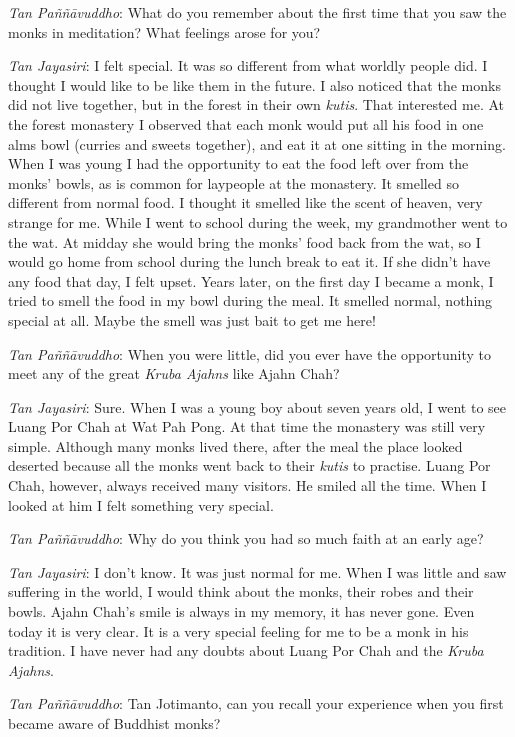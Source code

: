 \emph{Tan Paññāvuddho}: What do you remember about the first time that
you saw the monks in meditation? What feelings arose for you?

\emph{Tan Jayasiri}: I felt special. It was so different from what
worldly people did. I thought I would like to be like them in the
future. I also noticed that the monks did not live together, but in the
forest in their own \emph{kutis}. That interested me. At the forest
monastery I observed that each monk would put all his food in one alms
bowl (curries and sweets together), and eat it at one sitting in the
morning. When I was young I had the opportunity to eat the food left
over from the monks' bowls, as is common for laypeople at the monastery.
It smelled so different from normal food. I thought it smelled like the
scent of heaven, very strange for me. While I went to school during the
week, my grandmother went to the wat. At midday she would bring the
monks' food back from the wat, so I would go home from school during the
lunch break to eat it. If she didn't have any food that day, I felt
upset. Years later, on the first day I became a monk, I tried to smell
the food in my bowl during the meal. It smelled normal, nothing special
at all. Maybe the smell was just bait to get me here!

\emph{Tan Paññāvuddho}‎: When you were little, did you ever have the
opportunity to meet any of the great \emph{Kruba Ajahns‎‎} like Ajahn
Chah?

\emph{Tan Jayasiri}: Sure. When I was a young boy about seven years old,
I went to see Luang Por Chah at Wat Pah Pong. At that time the monastery
was still very simple. Although many monks lived there, after the meal
the place looked deserted because all the monks went back to their
\emph{kutis} to practise. Luang Por Chah, however, always received many
visitors. He smiled all the time. When I looked at him I felt something
very special.

\emph{Tan Paññāvuddho}‎: Why do you think you had so much faith at an
early age?

\emph{Tan Jayasiri}: I don't know. It was just normal for me. When I was
little and saw suffering in the world, I would think about the monks,
their robes and their bowls. Ajahn Chah's smile is always in my memory,
it has never gone. Even today it is very clear. It is a very special
feeling for me to be a monk in his tradition. I have never had any
doubts about Luang Por Chah and the \emph{Kruba Ajahns‎‎}.

\emph{Tan Paññāvuddho}‎: Tan Jotimanto, can you recall your experience
when you first became aware of Buddhist monks?


